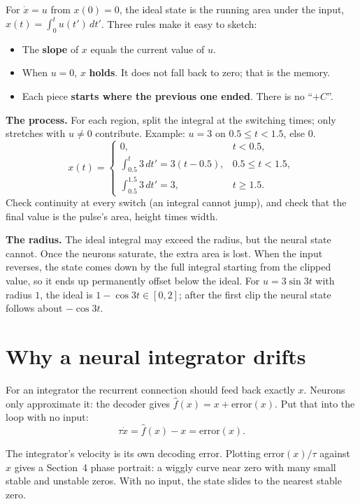 \documentclass[11pt,letterpaper]{article}
\begin{document}
For $\dot x = u$ from $x(0) = 0$, the ideal state is the running area under the input, $x(t) = \int_0^t u(t')\,dt'$. Three rules make it easy to sketch:
\begin{itemize}
\item The \textbf{slope} of $x$ equals the current value of $u$.
\item When $u = 0$, $x$ \textbf{holds}. It does not fall back to zero; that is the memory.
\item Each piece \textbf{starts where the previous one ended}. There is no ``$+C$''.
\end{itemize}
\textbf{The process.} For each region, split the integral at the switching times; only stretches with $u \ne 0$ contribute. Example: $u = 3$ on $0.5 \le t < 1.5$, else $0$.
\[
x(t) = \begin{cases} 0, & t < 0.5,\\ \int_{0.5}^{t} 3\,dt' = 3(t - 0.5), & 0.5 \le t < 1.5,\\ \int_{0.5}^{1.5} 3\,dt' = 3, & t \ge 1.5. \end{cases}
\]
Check continuity at every switch (an integral cannot jump), and check that the final value is the pulse's area, height times width.

\begin{trap}
\textbf{The radius.} The ideal integral may exceed the radius, but the neural state cannot. Once the neurons saturate, the extra area is lost. When the input reverses, the state comes down by the full integral starting from the clipped value, so it ends up permanently offset below the ideal. For $u = 3\sin 3t$ with radius $1$, the ideal is $1 - \cos 3t \in [0, 2]$; after the first clip the neural state follows about $-\cos 3t$.
\end{trap}

\section{Why a neural integrator drifts}

For an integrator the recurrent connection should feed back exactly $x$. Neurons only approximate it: the decoder gives $\hat f(x) = x + \mathrm{error}(x)$. Put that into the loop with no input:
\[
\tau\dot x = \hat f(x) - x = \mathrm{error}(x).
\]
\begin{key}
The integrator's velocity is its own decoding error. Plotting $\mathrm{error}(x)/\tau$ against $x$ gives a Section~4 phase portrait: a wiggly curve near zero with many small stable and unstable zeros. With no input, the state slides to the nearest stable zero.
\end{key}
\end{document}
